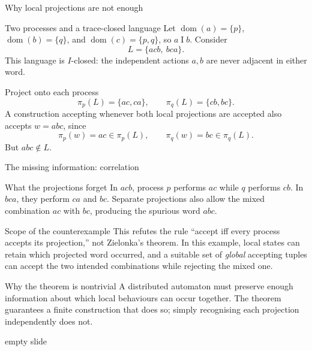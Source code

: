\documentclass[t,11pt]{beamer}
\newcommand{\domn}{\operatorname{dom}}
\newcommand{\ind}{\mathrel{I}}
\begin{document}
\begin{frame}{Why local projections are not enough}
  \begin{block}{Two processes and a trace-closed language}
    Let $\domn(a)=\{p\}$, $\domn(b)=\{q\}$, and $\domn(c)=\{p,q\}$, so $a\ind b$. Consider
    \[
      L=\{acb,\ bca\}.
    \]
    This language is $I$-closed: the independent actions $a,b$ are never adjacent in either word.
  \end{block}
  \begin{block}{Project onto each process}
    \[
      \pi_p(L)=\{ac,ca\},\qquad \pi_q(L)=\{cb,bc\}.
    \]
    A construction accepting whenever both local projections are accepted also accepts $w=abc$, since
    \[
      \pi_p(w)=ac\in\pi_p(L),\qquad \pi_q(w)=bc\in\pi_q(L).
    \]
    But $abc\notin L$.
  \end{block}
\end{frame}

\begin{frame}{The missing information: correlation}
  \begin{block}{What the projections forget}
    In $acb$, process $p$ performs $ac$ while $q$ performs $cb$. In $bca$, they perform $ca$ and $bc$. Separate projections also allow the mixed combination $ac$ with $bc$, producing the spurious word $abc$.
  \end{block}
  \begin{block}{Scope of the counterexample}
    This refutes the rule ``accept iff every process accepts its projection,'' not Zielonka's theorem. In this example, local states can retain which projected word occurred, and a suitable set of \emph{global} accepting tuples can accept the two intended combinations while rejecting the mixed one.
  \end{block}
  \begin{block}{Why the theorem is nontrivial}
    A distributed automaton must preserve enough information about which local behaviours can occur together. The theorem guarantees a finite construction that does so; simply recognising each projection independently does not.
  \end{block}
\end{frame}





\begin{frame}
empty slide
\end{frame}

\end{document}

